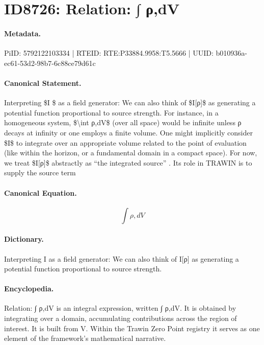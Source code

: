 \section*{ID8726: Relation: ∫ ρ,dV}
\paragraph{Metadata.}
PiID: 5792122103334 | RTEID: RTE:P33884.9958:T5.5666 | UUID: b010936a-ec61-53d2-98b7-6c88ce79d61c

\paragraph{Canonical Statement.}
Interpreting \$I \$ as a field generator: We can also think of \$I[ρ]\$ as generating a potential function proportional to source strength. For instance, in a homogeneous system, \$\textbackslash{}int ρ,dV\$ (over all space) would be infinite unless ρ decays at infinity or one employs a finite volume. One might implicitly consider \$I\$ to integrate over an appropriate volume related to the point of evaluation (like within the horizon, or a fundamental domain in a compact space). For now, we treat \$I[ρ]\$ abstractly as “the integrated source” . Its role in TRAWIN is to supply the source term

\paragraph{Canonical Equation.}
\[
\int ρ,dV
\]

\paragraph{Dictionary.}
Interpreting I as a field generator: We can also think of I[ρ] as generating a potential function proportional to source strength.

\paragraph{Encyclopedia.}
Relation: ∫ ρ,dV is an integral expression, written ∫ ρ,dV. It is obtained by integrating over a domain, accumulating contributions across the region of interest. It is built from V. Within the Trawin Zero Point registry it serves as one element of the framework's mathematical narrative.
